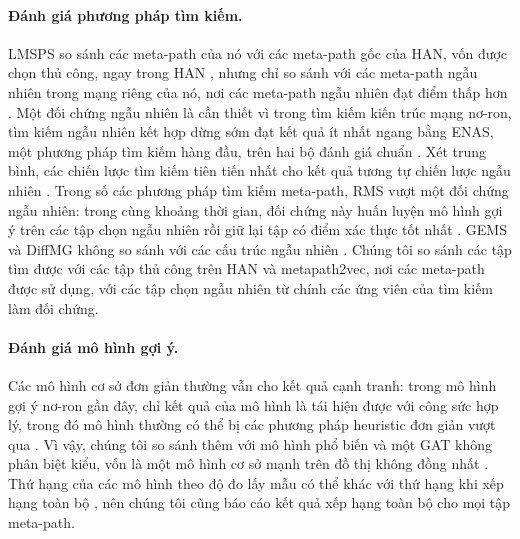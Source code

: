 \paragraph{Đánh giá phương pháp tìm kiếm.} LMSPS so sánh các meta-path của nó với các meta-path
gốc của HAN, vốn được chọn thủ công, ngay trong HAN \citep[Bảng~4]{li2024longrange}, nhưng chỉ so
sánh với các meta-path ngẫu nhiên trong mạng riêng của nó, nơi các meta-path ngẫu nhiên đạt điểm thấp
hơn \citep[Bảng~1]{li2024longrange}. Một đối chứng ngẫu nhiên là cần thiết vì trong tìm kiếm kiến
trúc mạng nơ-ron, tìm kiếm ngẫu nhiên kết hợp dừng sớm đạt kết quả ít nhất ngang bằng ENAS, một
phương pháp tìm kiếm hàng đầu, trên hai bộ đánh giá chuẩn \citep{li2019random}. Xét trung bình, các
chiến lược tìm kiếm tiên tiến nhất cho kết quả tương tự chiến lược ngẫu nhiên
\citep{yu2020evaluating}. Trong số các phương pháp tìm kiếm meta-path, RMS vượt một đối chứng ngẫu
nhiên: trong cùng khoảng thời gian, đối chứng này huấn luyện mô hình gợi ý trên các tập chọn ngẫu
nhiên rồi giữ lại tập có điểm xác thực tốt nhất \citep{ning2022automatic}. GEMS và DiffMG không so
sánh với các cấu trúc ngẫu nhiên \citep{han2020genetic,ding2021diffmg}. Chúng tôi so sánh các tập
tìm được với các tập thủ công trên HAN và metapath2vec, nơi các meta-path được sử dụng, với các tập
chọn ngẫu nhiên từ chính các ứng viên của tìm kiếm làm đối chứng.

\paragraph{Đánh giá mô hình gợi ý.} Các mô hình cơ sở đơn giản thường vẫn cho kết quả cạnh tranh:
trong  mô hình gợi ý nơ-ron gần đây, chỉ kết quả của  mô hình
là tái hiện được với công sức hợp lý, trong đó  mô hình thường có thể bị các
phương pháp heuristic đơn giản vượt qua \citep{dacrema2019progress}. Vì vậy, chúng tôi so sánh thêm
với mô hình phổ biến và một GAT không phân biệt kiểu, vốn là một mô hình cơ sở mạnh trên đồ thị
không đồng nhất \citep{lv2021hgb}. Thứ hạng của các mô hình theo độ đo lấy mẫu có thể khác với thứ
hạng khi xếp hạng toàn bộ \citep{krichene2022sampled}, nên chúng tôi cũng báo cáo kết quả xếp hạng
toàn bộ cho mọi tập meta-path.
